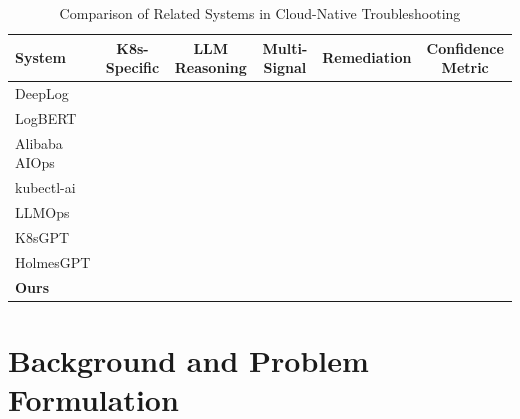\documentclass[12pt,onecolumn,draftclsnofoot]{IEEEtran}
\newcommand{\cmark}{\ding{51}}
\newcommand{\xmark}{\ding{55}}
\begin{document}
\begin{table}[h]
\caption{Comparison of Related Systems in Cloud-Native Troubleshooting}
\label{tab:related}
\centering
\small
\begin{tabular}{lccccc}
\toprule
\textbf{System} & \textbf{K8s-Specific} & \textbf{LLM Reasoning} & \textbf{Multi-Signal} & \textbf{Remediation} & \textbf{Confidence Metric} \\
\midrule
DeepLog \cite{du2017deeplog}         & \xmark & \xmark & \xmark & \xmark & \xmark \\
LogBERT \cite{guo2021logbert}        & \xmark & \xmark & \xmark & \xmark & \xmark \\
Alibaba AIOps \cite{chen2020aiops}   & \xmark & \xmark & \cmark & \xmark & \xmark \\
kubectl-ai \cite{kubectlai2023}      & \cmark & \cmark & \xmark & \xmark & \xmark \\
LLMOps \cite{deng2023llmops}         & \xmark & \cmark & \xmark & \xmark & \xmark \\
K8sGPT \cite{k8sgpt2023}             & \cmark & \cmark & \xmark & \cmark & \xmark \\
HolmesGPT \cite{holmesgpt2024}       & \cmark & \cmark & \cmark & \cmark & \xmark \\
\textbf{Ours}                        & \cmark & \cmark & \cmark & \cmark & \cmark \\
\bottomrule
\end{tabular}
\end{table}

\section{Background and Problem Formulation}
\end{document}
